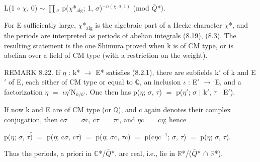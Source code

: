 \documentclass[10pt,twoside]{article}
\begin{document}
L(1 \ensuremath{∘} \ensuremath{χ}, 0) \ensuremath{∼} \ensuremath{∏}\ensuremath{_{σ}} p(\ensuremath{χ}*\ensuremath{_{\mathrm{alg}}}; 1, \ensuremath{σ})\ensuremath{^{−n(χ;σ,1)}}    (mod \ensuremath{\bar{Q}}*).\par
For E sufficiently large, \ensuremath{χ}*\ensuremath{_{\mathrm{alg}}} is the algebraic part of a Hecke character \ensuremath{χ}*, and the periods are interpreted as periods of abelian integrals (8.19), (8.3). The resulting statement is the one Shimura proved when k is of CM type, or is abelian over a field of CM type (with a restriction on the weight).\par
REMARK 8.22. If \ensuremath{η} : k* \ensuremath{→} E* satisfies (8.2.1), there are subfields k\ensuremath{′} of k and E\ensuremath{′} of E, each either of CM type or equal to \ensuremath{ℚ}, an inclusion \ensuremath{ι} : E\ensuremath{′} \ensuremath{→} E, and a factorization \ensuremath{η} \ensuremath{=} \ensuremath{ι}\ensuremath{η}\ensuremath{′}N\ensuremath{_{k/k′}}. One then has p(\ensuremath{η}; \ensuremath{σ}, \ensuremath{τ}) \ensuremath{=} p(\ensuremath{η}\ensuremath{′}; \ensuremath{σ} \ensuremath{|} k\ensuremath{′}, \ensuremath{τ} \ensuremath{|} E\ensuremath{′}).\par
If now k and E are of CM type (or \ensuremath{ℚ}), and c again denotes their complex conjugation, then c\ensuremath{σ} \ensuremath{=} \ensuremath{σ}c, c\ensuremath{τ} \ensuremath{=} \ensuremath{τ}c, and \ensuremath{η}c \ensuremath{=} c\ensuremath{η}; hence\par
p(\ensuremath{η}; \ensuremath{σ}, \ensuremath{τ}\ensuremath{\bar{)}} \ensuremath{=} p(\ensuremath{η}; c\ensuremath{σ}, c\ensuremath{τ}) \ensuremath{=} p(\ensuremath{η}; \ensuremath{σ}c, \ensuremath{τ}c) \ensuremath{=} p(c\ensuremath{η}c\ensuremath{^{-1}}; \ensuremath{σ}, \ensuremath{τ}) \ensuremath{=} p(\ensuremath{η}; \ensuremath{σ}, \ensuremath{τ}).\par
Thus the periods, a priori in \ensuremath{ℂ}*/\ensuremath{\bar{Q}}*, are real, i.e., lie in \ensuremath{ℝ}*/(\ensuremath{\bar{Q}}* \ensuremath{∩} \ensuremath{ℝ}*).\par
\end{document}
